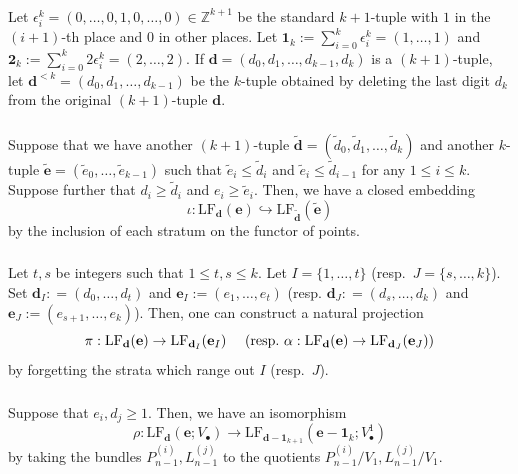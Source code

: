 \documentclass[a4paper]{amsart}
\theoremstyle{plain}
\theoremstyle{definition}
\numberwithin{equation}{section}
\begin{document}
\subsubsection{} \label{sec:tuples} Let $\epsilon_i^k = (0, \ldots, 0, 1, 0 , \ldots ,0 ) \in \mathbb{Z}^{k+1}$ be the standard $k+1$-tuple with $1$ in the $(i+1)$-th place and $0$ in other places. Let $\mathbf{1}_k:= \sum_{i=0}^k  \epsilon_i^k = (1, \ldots, 1)$ and $\mathbf{2}_k:= \sum_{i=0}^k  2 \epsilon_i^k = (2, \ldots, 2)$. If $\mathbf{d} = (d_0, d_1, \ldots, d_{k-1},d_k)$ is a $(k+1)$-tuple, let $\mathbf{d}^{<k} = (d_0, d_1, \ldots, d_{k-1})$ be the $k$-tuple obtained by deleting the last digit $d_k$ from the original $(k+1)$-tuple $\mathbf{d}$.

\subsubsection{} Suppose that we have another $(k+1)$-tuple $\mathbf{\tilde{d}} = (\tilde d_0,\tilde d_1,\ldots,\tilde d_k)$ and another $k$-tuple $\mathbf{\tilde e} = (\tilde e_0,\ldots,\tilde e_{k-1})$ such that $\tilde e_i \leq \tilde d_i$ and $\tilde e_i \leq \tilde d_{i-1}$ for any $1\leq i \leq k$. Suppose further that $d_i \geq \tilde d_i$ and $e_i \geq \tilde e_i$. Then, we have a closed embedding
\[  \iota: \mathrm{LF}_{\mathbf{d}}(\mathbf{e}) \hookrightarrow \mathrm{LF}_{\mathbf{\tilde d}}(\mathbf{ \tilde e}) \]
by the inclusion of each stratum on the functor of points.
\subsubsection{}
Let $t,s$ be integers such that $1\leq t, s\leq k$. Let $I=\{1,\ldots,t\}$ (resp.\ $J=\{s,\ldots,k\}$). Set $\mathbf{d}_I: = (d_0, \ldots, d_t)$ and $\mathbf{e}_I:=(e_1, \ldots, e_t) $ (resp. $\mathbf{d}_J: = (d_s, \ldots, d_k)$ and $\mathbf{e}_J:=(e_{s+1}, \ldots, e_k) $). Then, one can construct a natural projection
\[  \pi: \mathrm{LF}_{\mathbf{d}}(\mathbf{e})  \to \mathrm{LF}_{\mathbf{d}_I}(\mathbf{e}_I) \quad \textnormal{ (resp.\ $\alpha: \mathrm{LF}_{\mathbf{d}}(\mathbf{e})  \to \mathrm{LF}_{\mathbf{d}_J}(\mathbf{e}_J)$)} \]
by forgetting the strata which range out $I$ (resp.\ $J$).
\subsubsection{ } Suppose that $e_i,d_j \geq 1$. Then, we have an isomorphism
\[ \rho: \mathrm{LF}_{\mathbf{d}}(\mathbf{e};V_\bullet) \to \mathrm{LF}_{\mathbf{d}-\mathbf{1}_{k+1}}(\mathbf{e}-\mathbf{1}_{k}; V^1_\bullet) \]
by taking the bundles $P_{n-1}^{(i)}, L_{n-1}^{(j)}$ to the quotients $P_{n-1}^{(i)}/V_1, L_{n-1}^{(j)}/V_1$.
\end{document}
